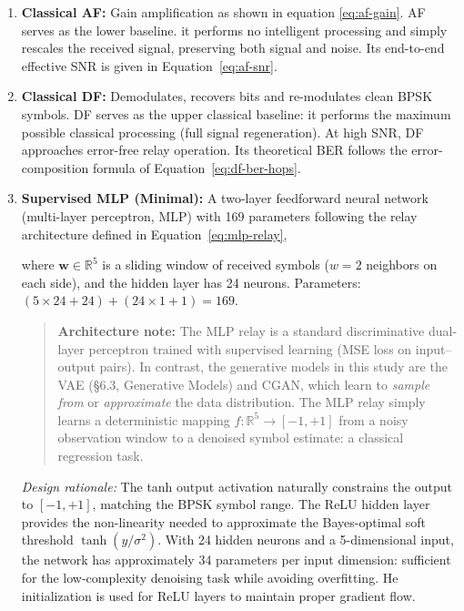 \begin{enumerate}
\item \textbf{Classical AF:} Gain amplification as shown in equation \ref{eq:af-gain}.  AF serves as the lower baseline. it performs no intelligent processing and simply rescales the received signal, preserving both signal and noise. Its end-to-end effective SNR is given in Equation~\ref{eq:af-snr}.
\item \textbf{Classical DF:} Demodulates, recovers bits and re-modulates clean BPSK symbols. DF serves as the upper classical baseline: it performs the maximum possible classical processing (full signal regeneration). At high SNR, DF approaches error-free relay operation. Its theoretical BER follows the error-composition formula of Equation~\ref{eq:df-ber-hops}.

\item \textbf{Supervised MLP (Minimal):} A two-layer feedforward neural network (multi-layer perceptron, MLP) with 169 parameters following the relay architecture defined in Equation~\ref{eq:mlp-relay},

where \(\mathbf{w} \in \mathbb{R}^5\) is a sliding window of received symbols (\(w=2\) neighbors on each side), and the hidden layer has 24 neurons. Parameters: \((5 \times 24 + 24) + (24 \times 1 + 1) = 169\).

\begin{quote}
\textbf{Architecture note:} The MLP relay is a standard discriminative dual-layer perceptron trained with supervised learning (MSE loss on input--output pairs). In contrast, the generative models in this study are the VAE (§6.3, Generative Models) and CGAN, which learn to \emph{sample from} or \emph{approximate} the data distribution. The MLP relay simply learns a deterministic mapping \(f: \mathbb{R}^5 \to [-1,+1]\) from a noisy observation window to a denoised symbol estimate: a classical regression task.
\end{quote}

\emph{Design rationale:} The tanh output activation naturally constrains the output to \([-1, +1]\), matching the BPSK symbol range.
The ReLU hidden layer provides the non-linearity needed to approximate the Bayes-optimal soft threshold \(\tanh(y/\sigma^2)\). With 24 hidden neurons and a 5-dimensional input, the network has approximately 34 parameters per input dimension: sufficient for the low-complexity denoising task while avoiding overfitting. He initialization is used for ReLU layers to maintain proper gradient flow.


\end{enumerate}
